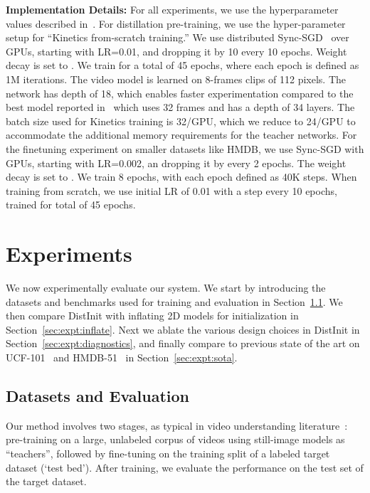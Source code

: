 \documentclass[10pt,twocolumn,letterpaper]{article}
\newcommand{\METHOD}[0]{DistInit}
\begin{document}
{\bf \noindent Implementation Details:}
For all experiments, we use the hyperparameter values described in~\cite{tran2018closer}.
For distillation pre-training, we use the hyper-parameter setup for ``Kinetics from-scratch training.'' We use distributed Sync-SGD~\cite{goyal2017accurate} over  GPUs, starting
with LR=0.01, and dropping it by 10 every 10 epochs. Weight decay is set to .
We train for a total of 45 epochs, where each epoch is defined as 1M iterations.
The video model is learned on 8-frames clips of 112 pixels. The network has
depth of 18, which enables faster experimentation compared  to the best model reported in~\cite{tran2018closer} which uses 32 frames and has a depth of 34 layers.
The batch size used for Kinetics training is 32/GPU, which we reduce to 24/GPU to accommodate the additional
memory requirements for the teacher networks.
For the finetuning experiment on smaller datasets like HMDB, we use Sync-SGD with  GPUs, starting
with LR=0.002, an dropping it by  every 2 epochs. The weight decay is set to . We train 8 epochs, with each epoch defined as 40K steps. 
When training from scratch, we use initial LR of 0.01 with a step every 10 epochs, trained for total of 45 epochs.
\section{Experiments}\label{sec:expt}

We now experimentally evaluate our system. We start by introducing the datasets and benchmarks used for training and evaluation in Section~\ref{sec:expt:data}. We then compare \METHOD{} with inflating 2D models for initialization in Section~\ref{sec:expt:inflate}. Next we ablate the various design choices in \METHOD{} in Section~\ref{sec:expt:diagnostics}, and finally compare to previous state of the art on UCF-101~\cite{ucf101} and HMDB-51~\cite{hmdb51} in Section~\ref{sec:expt:sota}.

\subsection{Datasets and Evaluation}\label{sec:expt:data}

Our method involves two stages, as typical in video understanding literature~\cite{carreira2017quo}: pre-training on a large, unlabeled corpus of videos using still-image models as ``teachers'', followed by fine-tuning on the training split of a labeled target dataset (`test bed'). After training, we evaluate the performance
on the test set of the target dataset. 
\end{document}
